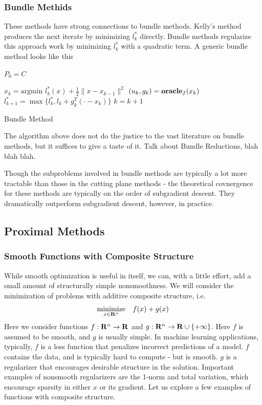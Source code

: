 \subsubsection{Bundle Methids}
These methods have strong connections to bundle methods.  Kelly's method
\cite{kelley1960cutting} produces the next iterate by minimizing $l^*_k$
directly. Bundle methods \cite{lemarechal1975extension,wolfe1975method}
regularize this approach work by minimizing $l_k^*$ with a quadratic term. A
generic bundle method looks like this

\begin{algorithm} 
  \SetAlgoNoLine
  \DontPrintSemicolon
  $P_0 = C$\;
  
   {
  \nl $x_{k}  = \mbox{argmin } l_k^*(x) + \tfrac{1}{2}\|x - x_{k-1}\|^2$\;
  \nl $(u_{k},g_{k})  = \mbox{\bf oracle}_f(x_{k})$\;
  \nl $l^*_{k+1}  = \max\{l^*_k, l_k + g_k^T(\cdot-x_k)\}$\;
  \nl $k = k + 1$
  }
  \caption{Bundle Method \label{alg:bundle}}
\end{algorithm}

The algorithm above does not do the justice to the vast literature on bundle methods,
but it suffices to give a taste of it. Talk about Bundle Reductions, blah blah blah.

Though the subproblems involved in bundle methods are typically a lot more tractable
than those in the cutting plane methods - the theoretical covnergence for these methods
are typically on the order of subgradient descent. They dramatically outperform
subgradient descent, however, in practice.

\subsection{Proximal Methods}

\subsubsection{Smooth Functions with Composite Structure} While smooth
optimization is useful in itself, we can, with a little effort, add a  small
amount of structurally simple nonsmoothness. We will consider the minimization
of problems with additive composite structure, i.e.
\begin{equation}
  \label{eq:minimize_fpg}
  \underset{x\in {\mathbf{R}}^n}{\text{minimize}} \quad f(x) + g(x)
\end{equation}
Here we consider functions $f:\mathbf{R}^n\to\mathbf{R}$ and
$g:\mathbf{R}^n\to\mathbf{R}\cup\{+\infty\}$. Here $f$ is assumed to be smooth, and $g$
is usually simple. In machine learning applications, typically, $f$ is a loss
function that penalizes incorrect predictions of a model. $f$ contains the
data, and is typically hard to compute - but is smooth. $g$ is a regularizer
that encourages desirable structure in the solution. Important examples of
nonsmooth regularizers are the 1-norm and total variation, which encourage
sparsity in either $x$ or its gradient. Let us explore a few examples of functions
with composite structure.

